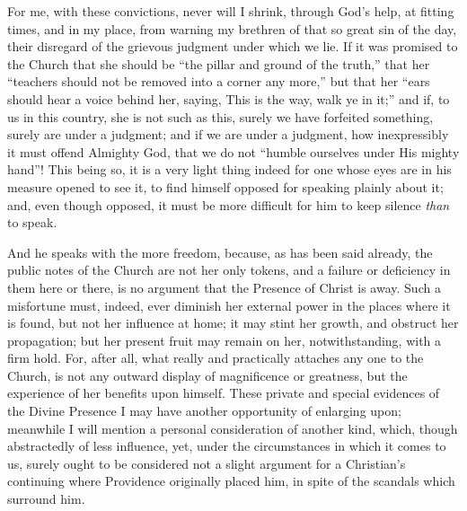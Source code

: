 For me, with these convictions, never will I shrink, through God's
help, at fitting times, and in my place, from warning my brethren of
that so great sin of the day, their disregard of the grievous judgment
under which we lie. If it was promised to the Church that she should
be ``the pillar and ground of the truth,'' that her
``teachers should not be removed into a corner any more,'' but
that her ``ears should hear a voice behind her, saying, This is
the way, walk ye in it;'' and if, to us in this country, she is
not such as this, surely we have forfeited something, surely are under
a judgment; and if we are under a judgment, how inexpressibly it must
offend Almighty God, that we do not ``humble ourselves under His
mighty hand''! This being so, it is a very light thing indeed for
one whose eyes are in his measure opened to see it, to find himself
opposed for speaking plainly about it; and, even though opposed, it
must be more difficult for him to keep silence \emph{than} to speak.

And he speaks with the more freedom, because, as has been said
already, the public notes of the Church are not her only tokens, and a
failure or deficiency in them here or there, is no argument that the
Presence of Christ is away. Such a misfortune must, indeed, ever
diminish her external power in the places where it is found, but not
her influence at home; it may stint her growth, and obstruct her
propagation; but her present fruit may remain on her, notwithstanding,
with a firm hold. For, after all, what really and practically attaches
any one to the Church, is not any outward display of magnificence or
greatness, but the experience of her benefits upon himself. These
private and special evidences of the Divine Presence I may have
another opportunity of enlarging upon; meanwhile I will mention a
personal consideration of another kind, which, though abstractedly of
less influence, yet, under the circumstances in which it comes to us,
surely ought to be considered not a slight argument for a Christian's
continuing where Providence originally placed him, in spite of the
scandals which surround him.

